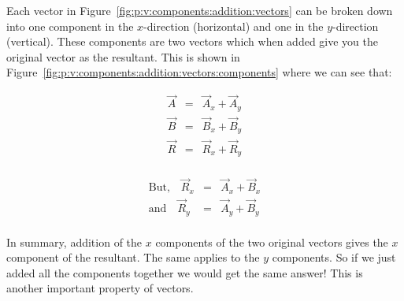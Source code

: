 Each vector in Figure~\ref{fig:p:v:components:addition:vectors} can be broken down into one component in the $x$-direction (horizontal) and one in the $y$-direction (vertical). These components are two vectors which when added give you the original vector as the resultant. This is shown in Figure~\ref{fig:p:v:components:addition:vectors:components} where we can see that:

\begin{minipage}{0.5\textwidth}
\begin{eqnarray*}
\vec{A}&=&\vec{A}_x+\vec{A}_y\\
\vec{B}&=&\vec{B}_x+\vec{B}_y\\
\vec{R}&=&\vec{R}_x+\vec{R}_y\\
\end{eqnarray*}
\end{minipage}
\begin{minipage}{0.5\textwidth}
\begin{eqnarray*}
\mbox{But,}\quad \vec{R}_x&=&\vec{A}_x+\vec{B}_x\\
\mbox{and}\quad\vec{R}_y&=&\vec{A}_y+\vec{B}_y\\
\end{eqnarray*}
\end{minipage}

In summary, addition of the $x$ components of the two original
vectors gives the $x$ component of the resultant. The same applies to
the $y$ components. So if we just added all the components 
together we would get the same answer! This is another important
property of vectors. 

